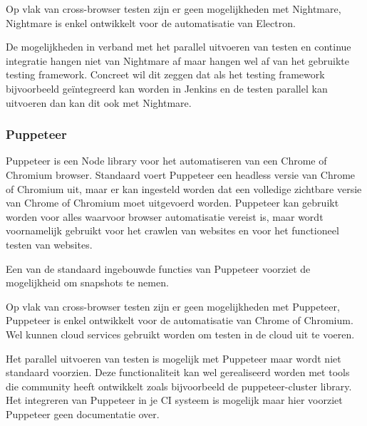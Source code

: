Op vlak van cross-browser testen zijn er geen mogelijkheden met Nightmare, Nightmare is enkel ontwikkelt voor de automatisatie van Electron.

De mogelijkheden in verband met het parallel uitvoeren van testen en continue integratie hangen niet van Nightmare af maar hangen wel af van het gebruikte testing framework. Concreet wil dit zeggen dat als het testing framework bijvoorbeeld geïntegreerd kan worden in Jenkins en de testen parallel kan uitvoeren dan kan dit ook met Nightmare.

\subsubsection{Puppeteer}
Puppeteer is een Node library voor het automatiseren van een Chrome of Chromium browser. Standaard voert Puppeteer een headless versie van Chrome of Chromium uit, maar er kan ingesteld worden dat een volledige zichtbare versie van Chrome of Chromium moet uitgevoerd worden. Puppeteer kan gebruikt worden voor alles waarvoor browser automatisatie vereist is, maar wordt voornamelijk gebruikt voor het crawlen van websites en voor het functioneel testen van websites.

Een van de standaard ingebouwde functies van Puppeteer voorziet de mogelijkheid om snapshots te nemen.

Op vlak van cross-browser testen zijn er geen mogelijkheden met Puppeteer, Puppeteer is enkel ontwikkelt voor de automatisatie van Chrome of Chromium. Wel kunnen cloud services gebruikt worden om testen in de cloud uit te voeren.

Het parallel uitvoeren van testen is mogelijk met Puppeteer maar wordt niet standaard voorzien. Deze functionaliteit kan wel gerealiseerd worden met tools die community heeft ontwikkelt zoals bijvoorbeeld de puppeteer-cluster library. Het integreren van Puppeteer in je CI systeem is mogelijk maar hier voorziet Puppeteer geen documentatie over.


